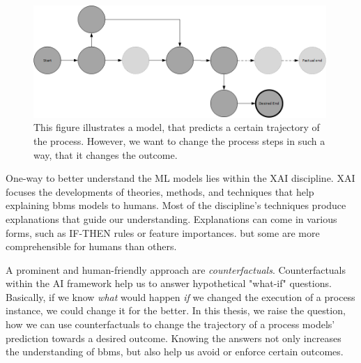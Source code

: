 \documentclass[./../../paper.tex]{subfiles}
\begin{document}
\begin{figure}[htb]
    \centering
    \includegraphics[width=0.99\textwidth]{figures/counterfactual_goal.png}
    \caption{This figure illustrates a model, that predicts a certain trajectory of the process. However, we want to change the process steps in such a way, that it changes the outcome.}
    \label{fig:desired_outcome}
\end{figure}

\noindent One-way to better understand the \gls{ML} models lies within the \gls{XAI} discipline. XAI focuses the developments of theories, methods, and techniques that help explaining \glspl{bbm} models to humans. Most of the discipline's techniques produce explanations that guide our understanding. Explanations can come in various forms, such as IF-THEN rules\autocite[p.90]{molnar2019} or feature importances\autocite[p.45]{molnar2019}. but some are more comprehensible for humans than others. 

A prominent and human-friendly approach are \emph{counterfactuals}\autocite[p. 221]{molnar2019}. Counterfactuals within the AI framework help us to answer hypothetical "what-if" questions. Basically, if we know \emph{what} would happen \emph{if} we changed the execution of a process instance, we could change it for the better. In this thesis, we raise the question, how we can use counterfactuals to change the trajectory of a process models' prediction towards a desired outcome. Knowing the answers not only increases the understanding of \glspl{bbm}, but also help us avoid or enforce certain outcomes. 
\end{document}
